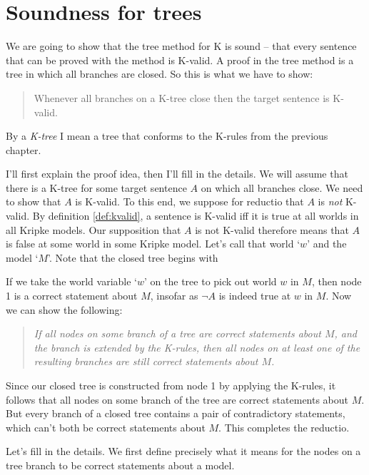 \section{Soundness for trees}%
\label{sec:soundnesstrees}

We are going to show that the tree method for K is sound -- that every sentence
that can be proved with the method is K-valid. A proof in the tree method is a
tree in which all branches are closed. So this is what we have to show:
%
\begin{quote}
  Whenever all branches on a K-tree close then the target sentence is K-valid.
\end{quote}
%
By a \emph{K-tree} I mean a tree that conforms to the K-rules from the previous
chapter.

I'll first explain the proof idea, then I'll fill in the details. We will assume
that there is a K-tree for some target sentence $A$ on which all branches close.
We need to show that $A$ is K-valid. To this end, we suppose for reductio that
$A$ is \emph{not} K-valid. By definition \ref{def:kvalid}, a sentence is K-valid
iff it is true at all worlds in all Kripke models. Our supposition that $A$ is
not K-valid therefore means that $A$ is false at some world in some Kripke
model. Let's call that world `$w$' and the model `$M$'. Note that the closed
tree begins with

\begin{center}
\end{center}

\noindent%
If we take the world variable `$w$' on the tree to pick out world $w$ in $M$,
then node 1 is a correct statement about $M$, insofar as $\neg A$ is indeed true
at $w$ in $M$. Now we can show the following:

\begin{quote}
    \emph{If all nodes on some branch of a tree are correct statements about
      $M$, and the branch is extended by the K-rules, then all nodes on at least
      one of the resulting branches are still correct statements about $M$.}
\end{quote}
%
Since our closed tree is constructed from node 1 by applying the K-rules, it
follows that all nodes on some branch of the tree are correct statements about
$M$. But every branch of a closed tree contains a pair of contradictory
statements, which can't both be correct statements about $M$. This completes the
reductio.

Let's fill in the details. We first define precisely what it means for the
nodes on a tree branch to be correct statements about a model.

